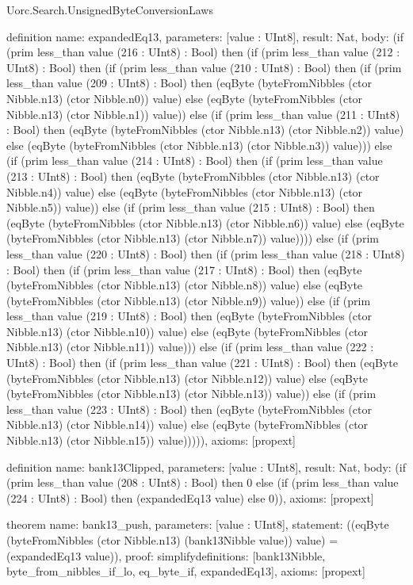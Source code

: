 \begin{lexlean}{Uorc.Search.UnsignedByteConversionLaws}
\begin{semanticmodule}
definition{
  name: expandedEq13,
  parameters: [value : UInt8],
  result: Nat,
  body: (if (prim less_than value (216 : UInt8) : Bool) then (if (prim less_than value (212 : UInt8) : Bool) then (if (prim less_than value (210 : UInt8) : Bool) then (if (prim less_than value (209 : UInt8) : Bool) then (eqByte (byteFromNibbles (ctor Nibble.n13) (ctor Nibble.n0)) value) else (eqByte (byteFromNibbles (ctor Nibble.n13) (ctor Nibble.n1)) value)) else (if (prim less_than value (211 : UInt8) : Bool) then (eqByte (byteFromNibbles (ctor Nibble.n13) (ctor Nibble.n2)) value) else (eqByte (byteFromNibbles (ctor Nibble.n13) (ctor Nibble.n3)) value))) else (if (prim less_than value (214 : UInt8) : Bool) then (if (prim less_than value (213 : UInt8) : Bool) then (eqByte (byteFromNibbles (ctor Nibble.n13) (ctor Nibble.n4)) value) else (eqByte (byteFromNibbles (ctor Nibble.n13) (ctor Nibble.n5)) value)) else (if (prim less_than value (215 : UInt8) : Bool) then (eqByte (byteFromNibbles (ctor Nibble.n13) (ctor Nibble.n6)) value) else (eqByte (byteFromNibbles (ctor Nibble.n13) (ctor Nibble.n7)) value)))) else (if (prim less_than value (220 : UInt8) : Bool) then (if (prim less_than value (218 : UInt8) : Bool) then (if (prim less_than value (217 : UInt8) : Bool) then (eqByte (byteFromNibbles (ctor Nibble.n13) (ctor Nibble.n8)) value) else (eqByte (byteFromNibbles (ctor Nibble.n13) (ctor Nibble.n9)) value)) else (if (prim less_than value (219 : UInt8) : Bool) then (eqByte (byteFromNibbles (ctor Nibble.n13) (ctor Nibble.n10)) value) else (eqByte (byteFromNibbles (ctor Nibble.n13) (ctor Nibble.n11)) value))) else (if (prim less_than value (222 : UInt8) : Bool) then (if (prim less_than value (221 : UInt8) : Bool) then (eqByte (byteFromNibbles (ctor Nibble.n13) (ctor Nibble.n12)) value) else (eqByte (byteFromNibbles (ctor Nibble.n13) (ctor Nibble.n13)) value)) else (if (prim less_than value (223 : UInt8) : Bool) then (eqByte (byteFromNibbles (ctor Nibble.n13) (ctor Nibble.n14)) value) else (eqByte (byteFromNibbles (ctor Nibble.n13) (ctor Nibble.n15)) value))))),
  axioms: [propext]
}

definition{
  name: bank13Clipped,
  parameters: [value : UInt8],
  result: Nat,
  body: (if (prim less_than value (208 : UInt8) : Bool) then 0 else (if (prim less_than value (224 : UInt8) : Bool) then (expandedEq13 value) else 0)),
  axioms: [propext]
}

theorem{
  name: bank13_push,
  parameters: [value : UInt8],
  statement: ((eqByte (byteFromNibbles (ctor Nibble.n13) (bank13Nibble value)) value) = (expandedEq13 value)),
  proof: simplify{definitions: [bank13Nibble, byte_from_nibbles_if_lo, eq_byte_if, expandedEq13]},
  axioms: [propext]
}


\end{semanticmodule}
\end{lexlean}
